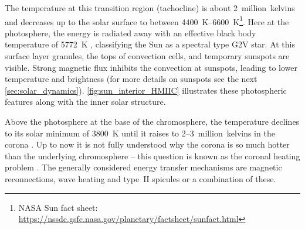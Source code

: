 The temperature at this transition region (tachocline) is about 2~million~kelvins and decreases up to the solar surface to between \SIrange{4400}{6600}{\K}\footnote{NASA Sun fact sheet: \url{https://nssdc.gsfc.nasa.gov/planetary/factsheet/sunfact.html}}. Here at the photosphere, the energy is radiated away with an effective black body temperature of \SI{5772}{\K} \citep{Mamajek2015}, classifying the Sun as a spectral type G2V star.
At this surface layer granules, the tops of convection cells, and temporary sunspots are visible. Strong magnetic flux inhibits the convection at sunspots, leading to lower temperature and brightness (for more details on sunspots see the next \autoref{sec:solar_dynamics}). \autoref{fig:sun_interior_HMIIC} illustrates these photospheric features along with the inner solar structure.
\begin{figure}[htb]
\end{figure}

Above the photosphere at the base of the chromosphere, the temperature declines to its solar minimum of \SI{3800}{\K} until it raises to \numrange{2}{3}~million~kelvins in the corona \citep{Billings1959,Liebenberg1975}. Up to now it is not fully understood why the corona is so much hotter than the underlying chromosphere -- this question is known as the coronal heating problem \citep{Fox2015}. The generally considered energy transfer mechanisms are magnetic reconnections, wave heating and type~II spicules or a combination of these.

